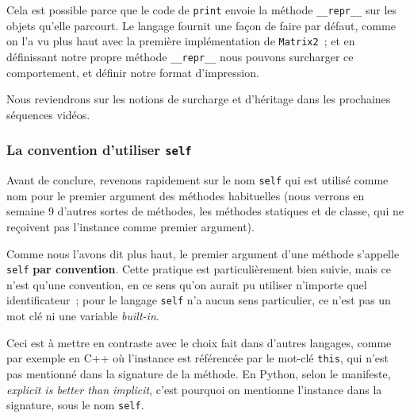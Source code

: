     Cela est possible parce que le code de \texttt{print} envoie la méthode
\texttt{\_\_repr\_\_} sur les objets qu'elle parcourt. Le langage
fournit une façon de faire par défaut, comme on l'a vu plus haut avec la
première implémentation de \texttt{Matrix2}~; et en définissant notre
propre méthode \texttt{\_\_repr\_\_} nous pouvons surcharger ce
comportement, et définir notre format d'impression.

    Nous reviendrons sur les notions de surcharge et d'héritage dans les
prochaines séquences vidéos.

    \hypertarget{la-convention-dutiliser-self}{%
\subsubsection{\texorpdfstring{La convention d'utiliser
\texttt{self}}{La convention d'utiliser self}}\label{la-convention-dutiliser-self}}

    Avant de conclure, revenons rapidement sur le nom \texttt{self} qui est
utilisé comme nom pour le premier argument des méthodes habituelles
(nous verrons en semaine 9 d'autres sortes de méthodes, les méthodes
statiques et de classe, qui ne reçoivent pas l'instance comme premier
argument).

Comme nous l'avons dit plus haut, le premier argument d'une méthode
s'appelle \texttt{self} \textbf{par convention}. Cette pratique est
particulièrement bien suivie, mais ce n'est qu'une convention, en ce
sens qu'on aurait pu utiliser n'importe quel identificateur~; pour le
langage \texttt{self} n'a aucun sens particulier, ce n'est pas un mot
clé ni une variable \emph{built-in}.

    Ceci est à mettre en contraste avec le choix fait dans d'autres
langages, comme par exemple en C++ où l'instance est référencée par le
mot-clé \texttt{this}, qui n'est pas mentionné dans la signature de la
méthode. En Python, selon le manifeste, \emph{explicit is better than
implicit}, c'est pourquoi on mentionne l'instance dans la signature,
sous le nom \texttt{self}.


    
    
    
